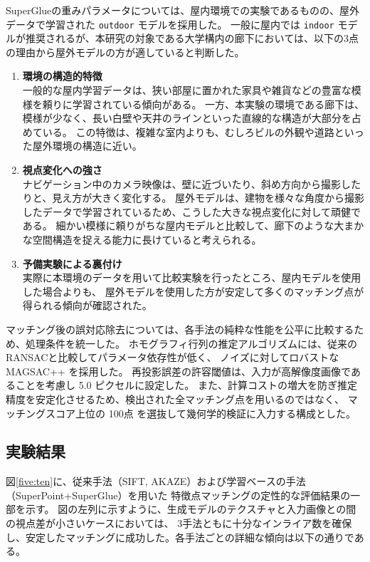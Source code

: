 SuperGlueの重みパラメータについては、屋内環境での実験であるものの、屋外データで学習された \texttt{outdoor} モデルを採用した。
一般に屋内では \texttt{indoor} モデルが推奨されるが、本研究の対象である大学構内の廊下においては、以下の3点の理由から屋外モデルの方が適していると判断した。

\begin{enumerate}
    \item \textbf{環境の構造的特徴} \\
    一般的な屋内学習データは、狭い部屋に置かれた家具や雑貨などの豊富な模様を頼りに学習されている傾向がある。
    一方、本実験の環境である廊下は、模様が少なく、長い白壁や天井のラインといった直線的な構造が大部分を占めている。
    この特徴は、複雑な室内よりも、むしろビルの外観や道路といった屋外環境の構造に近い。

    \item \textbf{視点変化への強さ} \\
    ナビゲーション中のカメラ映像は、壁に近づいたり、斜め方向から撮影したりと、見え方が大きく変化する。
    屋外モデルは、建物を様々な角度から撮影したデータで学習されているため、こうした大きな視点変化に対して頑健である。
    細かい模様に頼りがちな屋内モデルと比較して、廊下のような大まかな空間構造を捉える能力に長けていると考えられる。

    \item \textbf{予備実験による裏付け} \\
    実際に本環境のデータを用いて比較実験を行ったところ、屋内モデルを使用した場合よりも、
    屋外モデルを使用した方が安定して多くのマッチング点が得られる傾向が確認された。
\end{enumerate}

マッチング後の誤対応除去については、各手法の純粋な性能を公平に比較するため、処理条件を統一した。 
ホモグラフィ行列の推定アルゴリズムには、従来のRANSACと比較してパラメータ依存性が低く、
ノイズに対してロバストな MAGSAC++ を採用した\cite{magsac}。 
再投影誤差の許容閾値は、入力が高解像度画像であることを考慮し 5.0 ピクセルに設定した。 
また、計算コストの増大を防ぎ推定精度を安定化させるため、検出された全マッチング点を用いるのではなく、
マッチングスコア上位の 100点 を選抜して幾何学的検証に入力する構成とした。

\subsection{実験結果}
図\ref{five:ten}に、従来手法（SIFT, AKAZE）および学習ベースの手法（SuperPoint+SuperGlue）を用いた
特徴点マッチングの定性的な評価結果の一部を示す。
図の左列に示すように、生成モデルのテクスチャと入力画像との間の視点差が小さいケースにおいては、
3手法ともに十分なインライア数を確保し、安定したマッチングに成功した。各手法ごとの詳細な傾向は以下の通りである。

